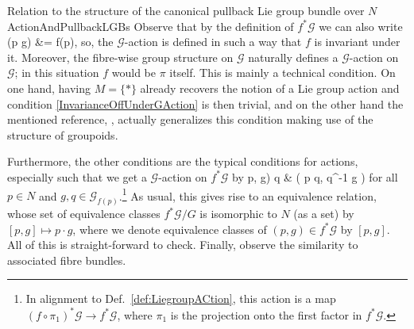 \documentclass[a4paper,oneside,11pt,bibliography=totoc]{scrartcl}
\def\ba#1\ea{\begin{align}#1\end{align}}
\def\bas#1\eas{\begin{align*}#1\end{align*}}
\theoremstyle{plain}
\theoremstyle{remark}
\theoremstyle{definition}
\begin{document}
\begin{remarks}{Relation to the structure of the canonical pullback Lie group bundle over $N$}{ActionAndPullbackLGBs}
Observe that by the definition of $f^*\mathcal{G}$ we can also write
\bas
f(p \cdot g) &= f(p),
\eas
so, the $\mathcal{G}$-action is defined in such a way that $f$ is invariant under it. Moreover, the fibre-wise group structure on $\mathcal{G}$ naturally defines a $\mathcal{G}$-action on $\mathcal{G}$; in this situation $f$ would be $\pi$ itself. This is mainly a technical condition. On one hand, having $M = \{*\}$ already recovers the notion of a Lie group action and condition \eqref{InvarianceOffUnderGAction} is then trivial, and on the other hand the mentioned reference, \cite[\S 1.6, Def.\ 1.6.1, page 34]{mackenzieGeneralTheory}, actually generalizes this condition making use of the structure of groupoids.
\newline

Furthermore, the other conditions are the typical conditions for actions, especially such that we get a $\mathcal{G}$-action on $f^*\mathcal{G}$ by
\ba
(p, g) \cdot q
&\coloneqq
\mleft( p \cdot q, q^{-1} g \mright)
\ea
for all $p \in N$ and $g, q \in \mathcal{G}_{f(p)}$.\footnote{In alignment to Def.\ \ref{def:LiegroupACtion}, this action is a map $(f \circ \pi_1)^*\mathcal{G} \to f^*\mathcal{G}$, where $\pi_1$ is the projection onto the first factor in $f^*\mathcal{G}$.}
As usual, this gives rise to an equivalence relation, whose set of equivalence classes $f^*\mathcal{G} \Big/ G$ is isomorphic to $N$ (as a set) by $[p, g] \mapsto p \cdot g$, where we denote equivalence classes of $(p, g) \in f^*\mathcal{G}$ by $[p, g]$. All of this is straight-forward to check. Finally, observe the similarity to associated fibre bundles.
\end{remarks}
\end{document}
